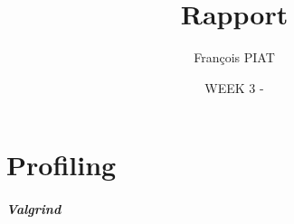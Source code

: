 \documentclass{report}
\title{Rapport}
\author{François PIAT}
\date{WEEK 3 - }
\begin{document}
\maketitle

\chapter*{Profiling}

\paragraph{Valgrind}
\end{document}
